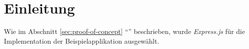 \section{Einleitung}

Wie im Abschnitt \ref{sec:proof-of-concept} ``'' beschrieben, wurde \emph{Express.js} \cite{Expressjs} für
die Implementation der Beispielapplikation ausgewählt.